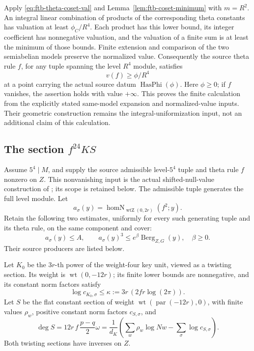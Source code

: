 Apply \eqref{eq:ftb-theta-coset-val} and
Lemma~\ref{lem:ftb-coset-minimum} with \(m=R^2\).
An integral linear combination of products of the corresponding
theta constants has valuation at least \(\phi_C/R^4\).
Each product has this lower bound, its integer coefficient has
nonnegative valuation, and the valuation of a finite sum is at least
the minimum of those bounds.  Finite extension and comparison of the
two semiabelian models preserve the normalized value.  Consequently
the source theta rule \(f\), for any tuple spanning the level
\(R^4\) module, satisfies
\[
             v(f)\geq\phi/R^4                       \tag{C7}\label{eq:ftb-tau-bound}
\]
at a point carrying the actual source datum \(\operatorname{HasPhi}(\phi)\).
Here \(\phi\geq0\); if \(f\) vanishes, the assertion holds with
value \(+\infty\).
This proves the finite calculation from the explicitly stated
same-model expansion and normalized-value inputs.  Their geometric
construction remains the integral-uniformization input, not an
additional claim of this calculation.

\subsection{The section \(f^{24}KS\)}
Assume \(5^4\mid M\), and supply the source admissible level-\(5^4\)
tuple and theta rule \(f\) nonzero on \(Z\).  This nonvanishing input
is the actual shifted-null-value construction of
; its scope is retained below.
The admissible tuple generates the full level module.
Let
\[
 a_\sigma(y)=
       \operatorname{homN}_{\operatorname{wtZ}(0,2r)}(f^2;y).
\]
Retain the following two estimates, uniformly for every such generating
tuple and its theta rule, on the same component and cover:
\[
 a_\sigma(y)\leq A,\qquad
 a_\sigma(y)^3\leq e^\beta\operatorname{Berg}_{Z,G}(y),
 \quad \beta\geq0.                                 \tag{C8}\label{eq:ftb-carry-analytic}
\]
Their source producers are listed below.

Let \(K_0\) be the \(3r\)-th power of the weight-four key unit,
viewed as a twisting section.  Its weight is
\(\operatorname{wt}(0,-12r)\); its finite lower bounds are
nonnegative, and its constant norm factors satisfy
\[
 \log c_{K_0,\sigma}\leq
 \kappa:=3r\,(2fr\log(2\pi)).
\]
Let \(S\) be the flat constant section of weight
\(\operatorname{wt}(\operatorname{par}(-12r),0)\), with finite
values \(\rho_w\), positive constant norm factors \(c_{S,\sigma}\),
and
\[
 \deg S
 =12r\,f\,\frac{p-q}{2}\omega
 =\frac1{d_K}\left(\sum_w\rho_w\log Nw
                         -\sum_\sigma\log c_{S,\sigma}\right).
 \tag{C9}\label{eq:ftb-flat-carry-deg}
\]
Both twisting sections have inverses on \(Z\).

